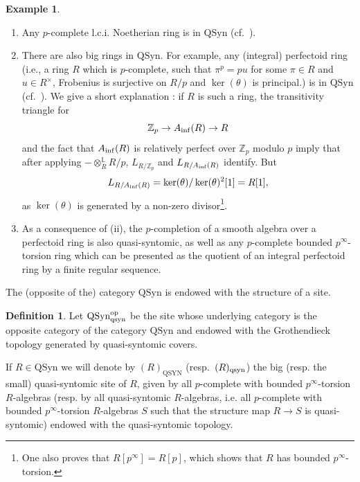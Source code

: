 \documentclass{amsart}
\theoremstyle{plain}
\theoremstyle{definition}
\newtheorem{definition}[theorem]{Definition}
\newtheorem{example}[theorem]{Example}
\newcommand{\zp}{\mathbb{Z}_p}
\newcommand{\red}[1]{{\color{black} #1}}
\begin{document}
\begin{example}
  \label{sec:quasi-syntomic-rings-example-quasi-syntomic-rings}
\begin{enumerate}
\item Any $p$-complete l.c.i. Noetherian ring is in $\mathrm{QSyn}$ (cf.\ \cite[Theorem 1.2]{avramov_locally_complete_intersection_homomorphisms_and_a_conjecture_of_quillen_on_the_vanishing_of_cotangent_homology}). 

\item There are also big rings in $\mathrm{QSyn}$. For example, any (integral)
perfectoid ring (i.e., a ring $R$ which is $p$-complete, such that $\pi^p=pu$
for some $\pi\in R$ and $u \in R^{\times}$, Frobenius is surjective on $R/p$ and
$\ker(\theta)$ is principal.) is in $\mathrm{QSyn}$ (cf.\ \cite[Proposition 4.18]{bhatt_morrow_scholze_topological_hochschild_homology}). We give a short explanation : if $R$ is such a ring,
the transitivity triangle for
\[  \zp \to A_{\rm inf}(R) \to R \]
and the fact that $A_{\rm inf}(R)$ is relatively perfect over $\zp$ modulo $p$
imply that after applying $- \otimes_R^{\mathbb{L}} R/p$, $L_{R/\zp}$ and $L_{R/A_{\rm inf}(R)}$ identify. But
\[ L_{R/A_{\rm inf}(R)} = \ker(\theta)/\ker(\theta)^2 [1]= R[1], \]
as $\ker(\theta)$ is generated by a non-zero divisor\footnote{One also proves that
$R[p^{\infty}]=R[p]$, which shows that $R$ has bounded $p^{\infty}$-torsion.}.

\item As a consequence of (ii), the $p$-completion of a smooth algebra over a
perfectoid ring is also quasi-syntomic, as well as any $p$-complete bounded $p^{\infty}$-torsion ring which can be presented as the quotient of an integral
perfectoid ring by a finite regular sequence. 
\end{enumerate}
\end{example} 

The (opposite of the) category $\mathrm{QSyn}$ is endowed with the structure of a site.


\begin{definition}
\label{sec:quasi-syn-rings-definition-quasi-syn-site}
Let $\mathrm{QSyn}_{\rm qsyn}^{\mathrm{op}}$ be the site whose underlying category is the opposite category of the category $\mathrm{QSyn}$ and endowed with the Grothendieck topology generated by quasi-syntomic covers.

If $R \in \mathrm{QSyn}$ we will denote by $(R)_{\mathrm{QSYN}}$ (resp.\ $(R)_{\rm qsyn}$) the big (resp. the small) quasi-syntomic site of $R$, given by all $p$-complete with bounded $p^{\infty}$-torsion \red{$R$-algebras (resp. by all quasi-syntomic $R$-algebras, i.e. all $p$-complete with bounded $p^{\infty}$-torsion $R$-algebras $S$ such that the structure map $R \to S$ is quasi-syntomic)} endowed with the quasi-syntomic topology. 
\end{definition}
\end{document}
